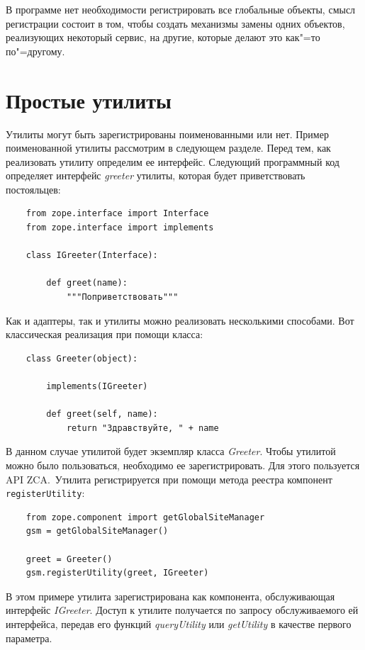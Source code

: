 \documentclass[a4paper,openany,twoside,draft]{book}
\providecommand*{\DUroletitlereference}[1]{\textsl{#1}}
\begin{document}
В программе нет необходимости регистрировать все глобальные объекты, смысл регистрации состоит в том, чтобы создать механизмы замены одних объектов, реализующих некоторый сервис, на другие, которые делают это как"=то по"=другому.


\section{Простые утилиты%
  \label{id41}%
}

Утилиты могут быть зарегистрированы поименованными или нет.  Пример поименованной утилиты рассмотрим в следующем разделе.  Перед тем, как реализовать утилиту определим ее интерфейс.  Следующий программный код определяет интерфейс \DUroletitlereference{greeter} утилиты, которая будет приветствовать постояльцев:

\begin{verbatim}
    from zope.interface import Interface
    from zope.interface import implements

    class IGreeter(Interface):

        def greet(name):
            """Поприветствовать"""
\end{verbatim}

Как и адаптеры, так и утилиты можно реализовать несколькими способами.  Вот классическая реализация при помощи класса:

\begin{verbatim}
    class Greeter(object):

        implements(IGreeter)

        def greet(self, name):
            return "Здравствуйте, " + name
\end{verbatim}

В данном случае утилитой будет экземпляр класса \DUroletitlereference{Greeter}.  Чтобы утилитой можно было пользоваться, необходимо ее зарегистрировать.  Для этого пользуется API ZCA.~Утилита регистрируется при помощи метода реестра компонент \texttt{registerUtility}:

\begin{verbatim}
    from zope.component import getGlobalSiteManager
    gsm = getGlobalSiteManager()

    greet = Greeter()
    gsm.registerUtility(greet, IGreeter)
\end{verbatim}

В этом примере утилита зарегистрирована как компонента, обслуживающая интерфейс \DUroletitlereference{IGreeter}.  Доступ к утилите получается по запросу обслуживаемого ей интерфейса, передав его функций \DUroletitlereference{queryUtility} или \DUroletitlereference{getUtility} в качестве первого параметра.
\end{document}
